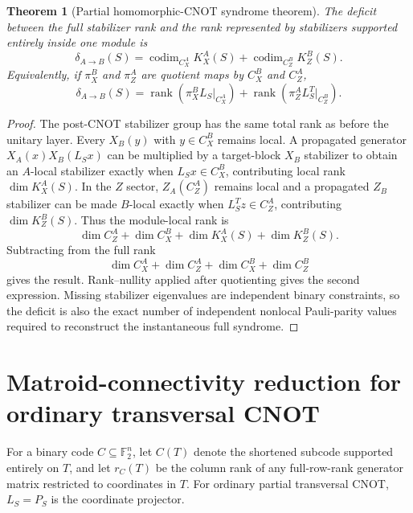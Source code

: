 \documentclass[aps,prx,preprint,superscriptaddress,nofootinbib,longbibliography]{revtex4-2}
\newtheorem{theorem}{Theorem}\newtheorem{lemma}[theorem]{Lemma}\newtheorem{proposition}[theorem]{Proposition}
\newcommand{\F}{\mathbb F_2}\newcommand{\E}{\mathbb E}\newcommand{\codim}{\operatorname{codim}}
\begin{document}
\begin{theorem}[Partial homomorphic-CNOT syndrome theorem]
The deficit between the full stabilizer rank and the rank represented by stabilizers supported entirely inside one module is
\begin{equation}
\delta_{A\to B}(S)=\codim_{C_X^A}K_X^A(S)+\codim_{C_Z^B}K_Z^B(S).
\end{equation}
Equivalently, if $\pi_X^B$ and $\pi_Z^A$ are quotient maps by $C_X^B$ and $C_Z^A$,
\begin{equation}
\delta_{A\to B}(S)=\operatorname{rank}(\pi_X^BL_S|_{C_X^A})+\operatorname{rank}(\pi_Z^AL_S^T|_{C_Z^B}).
\end{equation}
\end{theorem}
\begin{proof}
The post-CNOT stabilizer group has the same total rank as before the unitary layer. Every $X_B(y)$ with $y\in C_X^B$ remains local. A propagated generator $X_A(x)X_B(L_Sx)$ can be multiplied by a target-block $X_B$ stabilizer to obtain an $A$-local stabilizer exactly when $L_Sx\in C_X^B$, contributing local rank $\dim K_X^A(S)$. In the $Z$ sector, $Z_A(C_Z^A)$ remains local and a propagated $Z_B$ stabilizer can be made $B$-local exactly when $L_S^Tz\in C_Z^A$, contributing $\dim K_Z^B(S)$. Thus the module-local rank is
\begin{equation}
\dim C_Z^A+\dim C_X^B+\dim K_X^A(S)+\dim K_Z^B(S).
\end{equation}
Subtracting from the full rank
\begin{equation}
\dim C_X^A+\dim C_Z^A+\dim C_X^B+\dim C_Z^B
\end{equation}
gives the result. Rank--nullity applied after quotienting gives the second expression. Missing stabilizer eigenvalues are independent binary constraints, so the deficit is also the exact number of independent nonlocal Pauli-parity values required to reconstruct the instantaneous full syndrome.
\end{proof}

\section{Matroid-connectivity reduction for ordinary transversal CNOT}
For a binary code $C\subseteq\F^n$, let $C(T)$ denote the shortened subcode supported entirely on $T$, and let $r_C(T)$ be the column rank of any full-row-rank generator matrix restricted to coordinates in $T$. For ordinary partial transversal CNOT, $L_S=P_S$ is the coordinate projector.
\end{document}
